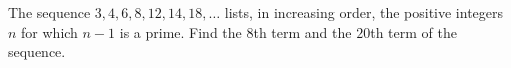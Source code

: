 The sequence $3,4,6,8,12,14,18,\dots$ lists, in increasing order, the positive integers $n$ for which $n-1$ is a prime. Find the $8$th term and the $20$th term of the sequence.
